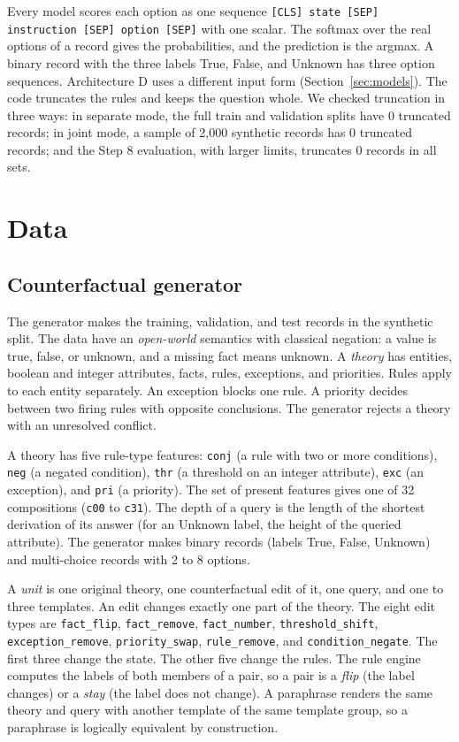 \documentclass[11pt,a4paper]{article}
\begin{document}
Every model scores each option as one sequence \texttt{[CLS] state [SEP] instruction [SEP] option [SEP]} with one scalar.
The softmax over the real options of a record gives the probabilities, and the prediction is the argmax.
A binary record with the three labels True, False, and Unknown has three option sequences.
Architecture D uses a different input form (Section~\ref{sec:models}).
The code truncates the rules and keeps the question whole.
We checked truncation in three ways: in separate mode, the full train and validation splits have 0 truncated records; in joint mode, a sample of 2{,}000 synthetic records has 0 truncated records; and the Step 8 evaluation, with larger limits, truncates 0 records in all sets.

\section{Data}\label{sec:data}

\subsection{Counterfactual generator}

The generator makes the training, validation, and test records in the synthetic split.
The data have an \emph{open-world} semantics with classical negation: a value is true, false, or unknown, and a missing fact means unknown.
A \emph{theory} has entities, boolean and integer attributes, facts, rules, exceptions, and priorities.
Rules apply to each entity separately.
An exception blocks one rule.
A priority decides between two firing rules with opposite conclusions.
The generator rejects a theory with an unresolved conflict.

A theory has five rule-type features: \texttt{conj} (a rule with two or more conditions), \texttt{neg} (a negated condition), \texttt{thr} (a threshold on an integer attribute), \texttt{exc} (an exception), and \texttt{pri} (a priority).
The set of present features gives one of 32 compositions (\texttt{c00} to \texttt{c31}).
The depth of a query is the length of the shortest derivation of its answer (for an Unknown label, the height of the queried attribute).
The generator makes binary records (labels True, False, Unknown) and multi-choice records with 2 to 8 options.

A \emph{unit} is one original theory, one counterfactual edit of it, one query, and one to three templates.
An edit changes exactly one part of the theory.
The eight edit types are \texttt{fact\_flip}, \texttt{fact\_remove}, \texttt{fact\_number}, \texttt{threshold\_shift}, \texttt{exception\_remove}, \texttt{priority\_swap}, \texttt{rule\_remove}, and \texttt{condition\_negate}.
The first three change the state.
The other five change the rules.
The rule engine computes the labels of both members of a pair, so a pair is a \emph{flip} (the label changes) or a \emph{stay} (the label does not change).
A paraphrase renders the same theory and query with another template of the same template group, so a paraphrase is logically equivalent by construction.
\end{document}

